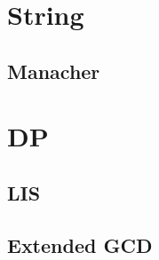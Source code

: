 \section{String}
    \subsection{Manacher}
        

\section{DP}
    \subsection{LIS}
        

    \subsection{Extended GCD}
        